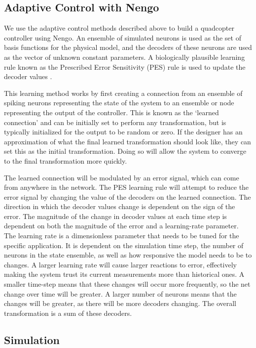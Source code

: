 \documentclass[letterpaper, 10 pt, conference]{ieeeconf}  %
\begin{document}
\subsection{Adaptive Control with Nengo}

We use the adaptive control methods described above to build a quadcopter controller using Nengo. 
An ensemble of simulated neurons is used as the set of basis functions for the physical model, and the decoders of these neurons are used as the vector of unknown constant parameters. 
A biologically plausible learning rule known as the Prescribed Error Sensitivity (PES) rule is used to update the decoder values \cite{bekolay2013simultaneous}. 

This learning method works by first creating a connection from an ensemble of spiking neurons representing the state of the system to an ensemble or node representing the output of the controller. 
This is known as the `learned connection' and can be initially set to perform any transformation, but is typically initialized for the output to be random or zero. 
If the designer has an approximation of what the final learned transformation should look like, they can set this as the initial transformation. 
Doing so will allow the system to converge to the final transformation more quickly.

The learned connection will be modulated by an error signal, which can come from anywhere in the network. 
The PES learning rule will attempt to reduce the error signal by changing the value of the decoders on the learned connection. 
The direction in which the decoder values change is dependent on the sign of the error. 
The magnitude of the change in decoder values at each time step is dependent on both the magnitude of the error and a learning-rate parameter. 
The learning rate is a dimensionless parameter that needs to be tuned for the specific application. 
It is dependent on the simulation time step, the number of neurons in the state ensemble, as well as how responsive the model needs to be to changes. 
A larger learning rate will cause larger reactions to error, effectively making the system trust its current measurements more than historical ones. 
A smaller time-step means that these changes will occur more frequently, so the net change over time will be greater. 
A larger number of neurons means that the changes will be greater, as there will be more decoders changing. The overall transformation is a sum of these decoders. 

\subsection{Simulation}
\end{document}
